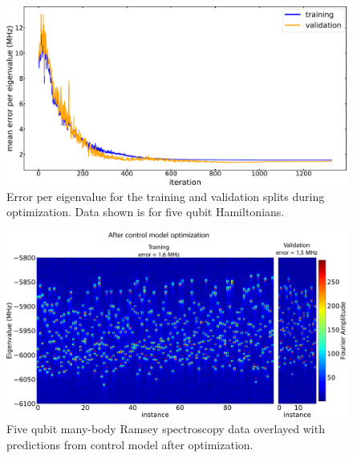 \begin{figure}[h]
    \begin{center}
        \includegraphics[width=150 mm]{./PDF/tv_error_during_opt.pdf}
        \caption{
        Error per eigenvalue for the training and validation splits during optimization.
        Data shown is for five qubit Hamiltonians.
        }
    \end{center}
\end{figure}

\begin{figure}[h]
    \begin{center}
        \includegraphics[width=150 mm]{./PDF/fourier_amp_2d_tv_post.pdf}
        \caption{
        Five qubit many-body Ramsey spectroscopy data overlayed with predictions from control model after optimization.
        }
    \end{center}
\end{figure}

